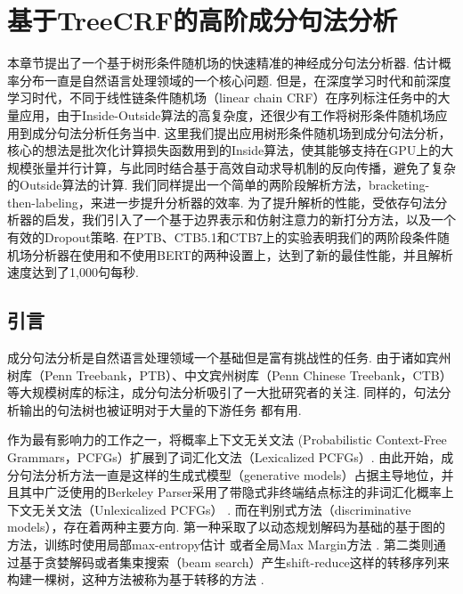 \chapter{基于TreeCRF的高阶成分句法分析}
\label{cha:con-crf}

本章节提出了一个基于树形条件随机场的快速精准的神经成分句法分析器.
估计概率分布一直是自然语言处理领域的一个核心问题.
但是，在深度学习时代和前深度学习时代，不同于线性链条件随机场（linear chain CRF）在序列标注任务中的大量应用，由于Inside-Outside算法的高复杂度，还很少有工作将树形条件随机场应用到成分句法分析任务当中.
这里我们提出应用树形条件随机场到成分句法分析，核心的想法是批次化计算损失函数用到的Inside算法，使其能够支持在GPU上的大规模张量并行计算，与此同时结合基于高效自动求导机制的反向传播，避免了复杂的Outside算法的计算.
我们同样提出一个简单的两阶段解析方法，bracketing-then-labeling，来进一步提升分析器的效率.
为了提升解析的性能，受依存句法分析器的启发，我们引入了一个基于边界表示和仿射注意力的新打分方法，以及一个有效的Dropout策略.
在PTB、CTB5.1和CTB7上的实验表明我们的两阶段条件随机场分析器在使用和不使用BERT的两种设置上，达到了新的最佳性能，并且解析速度达到了1,000句每秒.

\section{引言}\label{sec:con-intro}

成分句法分析是自然语言处理领域一个基础但是富有挑战性的任务.
由于诸如宾州树库（Penn Treebank，PTB）、中文宾州树库（Penn Chinese Treebank，CTB）等大规模树库的标注，成分句法分析吸引了一大批研究者的关注.
同样的，句法分析输出的句法树也被证明对于大量的下游任务 \citep{akoury-etal-2019-syntactically,wang-etal-2018-tree}都有用.

作为最有影响力的工作之一，\cite{collins-1997-three}将概率上下文无关文法 (Probabilistic Context-Free Grammars，PCFGs）扩展到了词汇化文法（Lexicalized PCFGs）.
由此开始，成分句法分析方法一直是这样的生成式模型（generative models）占据主导地位，并且其中广泛使用的Berkeley Parser采用了带隐式非终端结点标注的非词汇化概率上下文无关文法（Unlexicalized PCFGs） \citep{matsuzaki-etal-2005-probabilistic,petrov-klein-2007-improved}.
而在判别式方法（discriminative models），存在着两种主要方向.
第一种采取了以动态规划解码为基础的基于图的方法，训练时使用局部max-entropy估计 \citep{kaplan-etal-2004-speed}或者全局Max Margin方法 \citep{taskar-etal-2004-max}.
第二类则通过基于贪婪解码或者集束搜索（beam search）产生shift-reduce这样的转移序列来构建一棵树，这种方法被称为基于转移的方法 \citep{sagae-lavie-2005-classifier,zhu-etal-2013-fast}.


